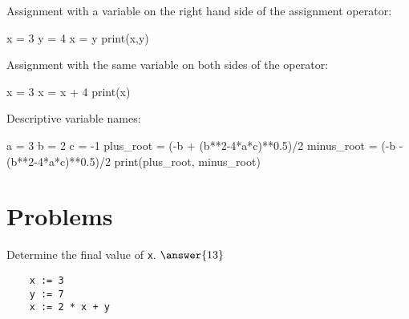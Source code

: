 \documentclass{ximera}
\begin{document}
Assignment with a variable on the right hand side of the assignment operator:

\begin{sageCell}
x = 3
y = 4
x = y
print(x,y)
\end{sageCell}

Assignment with the same variable on both sides of the operator:

\begin{sageCell}
x = 3
x = x + 4
print(x)
\end{sageCell}

Descriptive variable names:

\begin{sageCell}
a = 3
b = 2
c = -1
plus_root = (-b + (b**2-4*a*c)**0.5)/2
minus_root = (-b - (b**2-4*a*c)**0.5)/2
print(plus_root, minus_root)
\end{sageCell}

\section{Problems}

\begin{question}
	Determine the final value of \verb|x|. $\answer{13}$
	\begin{verbatim}
	x := 3
	y := 7
	x := 2 * x + y
	\end{verbatim}
\end{question}
\end{document}
